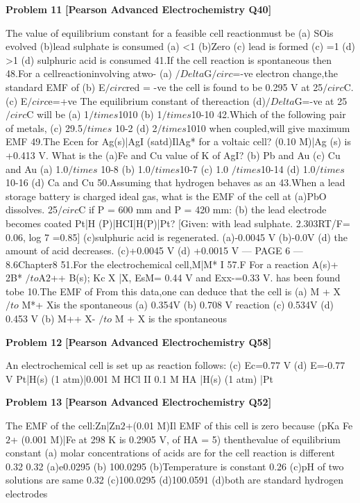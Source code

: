 \begin{problembox}
\textbf{Problem 11} \hfill \textbf{[Pearson Advanced Electrochemistry Q40]}
\label{q:ext-pearson-11}

The value of equilibrium constant for a
feasible cell reactionmust be
(a) SOis evolved
(b)lead sulphate is consumed
(a) <1
(b)Zero
(c) lead is formed
(c) =1
(d) >1
(d) sulphuric acid is consumed
41.If the cell reaction is spontaneous then
48.For a cellreactioninvolving atwo-
(a) $/Delta$G$/circ$=-ve
electron change,the standard EMF of
(b) E$/circ$red = -ve
the cell is found to be 0.295 V at 25$/circ$C.
(c) E$/circ$e=+ve
The equilibrium constant of thereaction
(d)$/Delta$G=-ve
at 25$/circ$C will be
(a) 1$/times$1010
(b) 1$/times$10-10
42.Which of the following pair of metals,
(c) 29.5$/times$ 10-2
(d) 2$/times$1010
when coupled,will give maximum EMF
49.The Ecen for Ag(s)|AgI (satd)IlAg*
for a voltaic cell?
(0.10 M)|Ag (s) is +0.413 V. What is the
(a)Fe and Cu
value of K of AgI?
(b) Pb and Au
(c) Cu and Au
(a) 1.0$/times$ 10-8
(b) 1.0$/times$10-7
(c) 1.0 $/times$10-14
(d) 1.0$/times$10-16
(d) Ca and Cu
50.Assuming that hydrogen behaves as an
43.When a lead storage battery is charged
ideal gas, what is the EMF of the cell at
(a)PbO dissolves.
25$/circ$C if P = 600 mm and P = 420 mm:
(b) the lead electrode becomes coated
Pt|H (P)|HCI|H(P)|Pt? [Given:
with lead sulphate.
2.303RT/F= 0.06, log 7 =0.85]
(c)sulphuric acid is regenerated.
(a)-0.0045 V
(b)-0.0V
(d) the amount of acid decreases.
(c)+0.0045 V
(d) +0.0015 V
--- PAGE 6 ---
8.6Chapter8
51.For the electrochemical cell,M|M* I
57.F
For a reaction A(s)+ 2B* $/to$A$2$++ B(s); Kc
X |X, EsM= 0.44 V and Exx-=0.33 V.
has been found tobe 10.The EMF of
From this data,one can deduce that
the cell is
(a) M + X $/to$ M*+ Xis the spontaneous
(a) 0.354V
(b) 0.708 V
reaction
(c) 0.534V
(d) 0.453 V
(b) M++ X- $/to$ M + X is the spontaneous
\end{problembox}

\begin{problembox}
\textbf{Problem 12} \hfill \textbf{[Pearson Advanced Electrochemistry Q58]}
\label{q:ext-pearson-12}

An electrochemical cell is set up as
reaction
follows:
(c) Ec=0.77 V
(d) E=-0.77 V
Pt|H(s) (1 atm)|0.001 M HCl II
0.1 M HA |H(s) (1 atm) |Pt
\end{problembox}

\begin{problembox}
\textbf{Problem 13} \hfill \textbf{[Pearson Advanced Electrochemistry Q52]}
\label{q:ext-pearson-13}

The EMF of the cell:Zn|Zn$2$+(0.01 M)Il
EMF of this cell is zero because (pKa
Fe$2$+ (0.001 M)|Fe at 298 K is 0.2905 V,
of HA = 5)
thenthevalue of equilibrium constant
(a) molar concentrations of acids are
for the cell reaction is
different
0.32
0.32
(a)e0.0295
(b) 100.0295
(b)Temperature is constant
0.26
(c)pH of two solutions are same
0.32
(c)100.0295
(d)100.0591
(d)both are standard hydrogen electrodes
\end{problembox}

